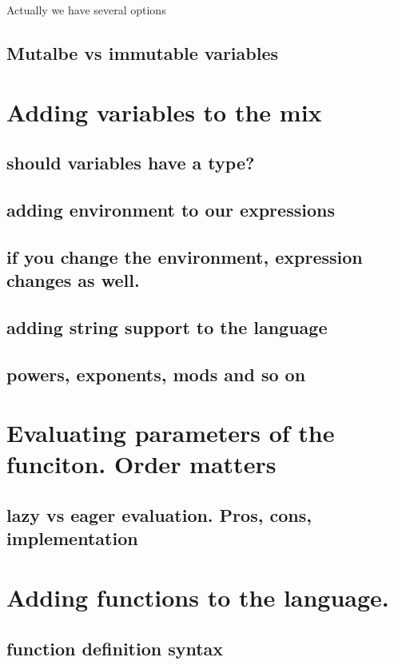 \documentclass[11pt]{article}
\begin{document}
Actually we have several options
\subsection{Mutalbe vs immutable variables}
\label{sec:org78e8e8e}
\section{Adding variables to the mix}
\label{sec:org5e4b820}
\subsection{should variables have a type?}
\label{sec:orgf9a617f}
\subsection{adding environment to our expressions}
\label{sec:org92c30ae}
\subsection{if you change the environment, expression changes as well.}
\label{sec:orgee35958}
\subsection{adding string support to the language}
\label{sec:org4780258}

\subsection{powers, exponents, mods and so on}
\label{sec:org385a45e}
\section{Evaluating parameters of the funciton. Order matters}
\label{sec:org60f1896}
\subsection{lazy vs eager evaluation. Pros, cons, implementation}
\label{sec:orgc3ab88d}
\section{Adding functions to the language.}
\label{sec:org293a653}
\subsection{function definition syntax}
\label{sec:org510010b}
\end{document}

